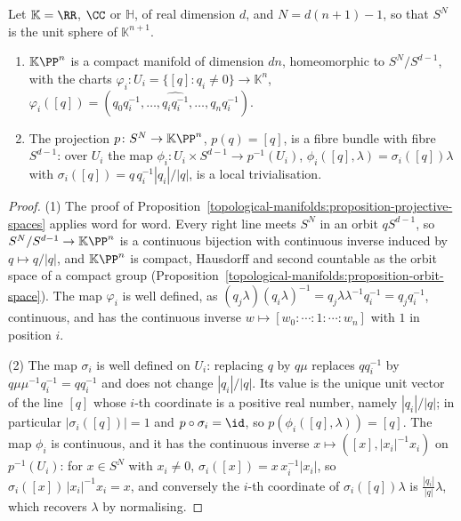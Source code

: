 \begin{proposition}\label{topological-manifolds:proposition-hopf-fibrations}
Let $\mathbb{K} = \RR$, $\CC$ or $\mathbb{H}$, of real dimension $d$, and $N = d(n + 1) - 1$, so that $S^N$ is the unit sphere of $\mathbb{K}^{n+1}$.
\begin{enumerate}
\item $\mathbb{K}\PP^n$ is a compact manifold of dimension $dn$, homeomorphic to $S^N/S^{d-1}$, with the charts $\varphi_i \colon U_i = \{[q] : q_i \neq 0\} \to \mathbb{K}^n$,
$\varphi_i([q]) = (q_0q_i^{-1}, \ldots, \widehat{q_iq_i^{-1}}, \ldots, q_nq_i^{-1})$.
\item The projection $p \colon S^N \to \mathbb{K}\PP^n$, $p(q) = [q]$, is a fibre bundle with fibre $S^{d-1}$: over $U_i$ the map $\phi_i \colon U_i \times S^{d-1} \to p^{-1}(U_i)$, $\phi_i([q], \lambda) = \sigma_i([q])\lambda$
with $\sigma_i([q]) = q\,q_i^{-1}|q_i|/|q|$, is a local trivialisation.
\end{enumerate}
\end{proposition}

\begin{proof}
(1) The proof of Proposition~\ref{topological-manifolds:proposition-projective-spaces} applies word for word. Every right line meets $S^N$ in an orbit $qS^{d-1}$, so $S^N/S^{d-1} \to \mathbb{K}\PP^n$ is a continuous
bijection with continuous inverse induced by $q \mapsto q/|q|$, and $\mathbb{K}\PP^n$ is compact, Hausdorff and second countable as the orbit space of a compact group (Proposition~\ref{topological-manifolds:proposition-orbit-space}).
The map $\varphi_i$ is well defined, as $(q_j\lambda)(q_i\lambda)^{-1} = q_j\lambda\lambda^{-1}q_i^{-1} = q_jq_i^{-1}$, continuous, and has the continuous inverse $w \mapsto [w_0 : \cdots : 1 : \cdots : w_n]$ with $1$ in position $i$.

(2) The map $\sigma_i$ is well defined on $U_i$: replacing $q$ by $q\mu$ replaces $qq_i^{-1}$ by $q\mu\mu^{-1}q_i^{-1} = qq_i^{-1}$ and does not change $|q_i|/|q|$. Its value is the unique unit vector of the line $[q]$ whose
$i$-th coordinate is a positive real number, namely $|q_i|/|q|$; in particular $|\sigma_i([q])| = 1$ and $p \circ \sigma_i = \id$, so $p(\phi_i([q], \lambda)) = [q]$. The map $\phi_i$ is continuous, and it has the continuous inverse
$x \mapsto ([x], |x_i|^{-1}x_i)$ on $p^{-1}(U_i)$: for $x \in S^N$ with $x_i \neq 0$, $\sigma_i([x]) = x\,x_i^{-1}|x_i|$, so $\sigma_i([x])\,|x_i|^{-1}x_i = x$, and conversely the $i$-th coordinate of $\sigma_i([q])\lambda$ is
$\frac{|q_i|}{|q|}\lambda$, which recovers $\lambda$ by normalising.
\end{proof}

